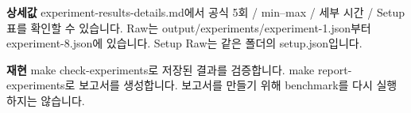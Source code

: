 \documentclass[11pt,a4paper]{article}
\begin{document}
\textbf{상세값}\newline
experiment-results-details.md에서 공식 5회 / min–max / 세부 시간 / Setup 표를 확인할 수 있습니다.\newline
Raw는 output/experiments/experiment-1.json부터 experiment-8.json에 있습니다.\newline
Setup Raw는 같은 폴더의 setup.json입니다.\par\smallskip
\textbf{재현}\newline
make check-experiments로 저장된 결과를 검증합니다.\newline
make report-experiments로 보고서를 생성합니다.\newline
보고서를 만들기 위해 benchmark를 다시 실행하지는 않습니다.
\end{document}
